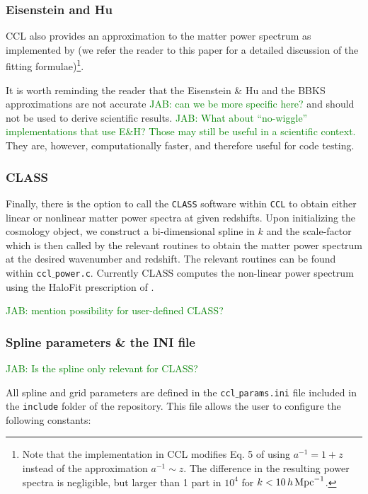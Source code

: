 \documentclass[\docopts]{\docclass}
\newcommand{\jab}[1]{\textcolor{green}{JAB: #1}}
\begin{document}
\subsubsection{Eisenstein and Hu}
CCL also provides an approximation to the matter power spectrum as implemented by \citet{1998ApJ...496..605E} (we refer the reader to this paper for a detailed discussion of the fitting formulae)\footnote{Note that the implementation in CCL modifies Eq. 5 of \citet{1998ApJ...496..605E} using $a^{-1}=1+z$ instead of the approximation $a^{-1}\sim z$. The difference in the resulting power spectra is negligible, but larger than 1 part in $10^4$ for $k<10\,h\,{\rm Mpc}^{-1}$.}.

It is worth reminding the reader that the Eisenstein \& Hu and the BBKS approximations are not accurate \jab{can we be more specific here?} and should not be used to derive scientific results. \jab{What about ``no-wiggle'' implementations that use E\&H? Those may still be useful in a scientific context.} They are, however, computationally faster, and therefore useful for code testing.

\subsubsection{CLASS}
Finally, there is the option to call the {\tt CLASS} software \citep{class} within {\tt CCL} to obtain either linear or nonlinear matter power spectra at given redshifts. Upon initializing the cosmology object, we construct a bi-dimensional spline in $k$ and the scale-factor which is then called by the relevant routines to obtain the matter power spectrum at the desired wavenumber and redshift. The relevant routines can be found within {\tt ccl$\_$power.c}. Currently CLASS computes the non-linear power spectrum using the HaloFit prescription of \cite{CLASS_halofit}.

\jab{mention possibility for user-defined CLASS?}

\subsubsection{Spline parameters \& the INI file}

\jab{Is the spline only relevant for CLASS?}

All spline and grid parameters are defined in the {\tt ccl$\_$params.ini} file included in the {\tt include} folder of the repository. This file allows the user to configure the following constants:
\end{document}
